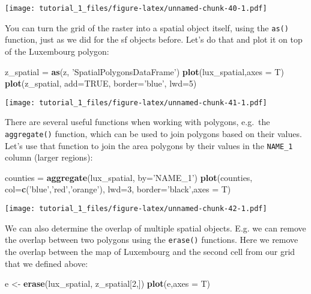 \documentclass[]{article}
\newenvironment{Shaded}{\begin{snugshade}}{\end{snugshade}}
\newcommand{\DataTypeTok}[1]{\textcolor[rgb]{0.13,0.29,0.53}{#1}}
\newcommand{\DecValTok}[1]{\textcolor[rgb]{0.00,0.00,0.81}{#1}}
\newcommand{\KeywordTok}[1]{\textcolor[rgb]{0.13,0.29,0.53}{\textbf{#1}}}
\newcommand{\NormalTok}[1]{#1}
\newcommand{\OtherTok}[1]{\textcolor[rgb]{0.56,0.35,0.01}{#1}}
\newcommand{\StringTok}[1]{\textcolor[rgb]{0.31,0.60,0.02}{#1}}
\begin{document}
\texttt{[image: tutorial\_1\_files/figure-latex/unnamed-chunk-40-1.pdf]}

You can turn the grid of the raster into a spatial object itself, using
the \texttt{as()} function, just as we did for the sf objects before.
Let's do that and plot it on top of the Luxembourg polygon:

\begin{Shaded}
\begin{Highlighting}[]
\NormalTok{z_spatial =}\StringTok{ }\KeywordTok{as}\NormalTok{(z, }\StringTok{'SpatialPolygonsDataFrame'}\NormalTok{)}
\KeywordTok{plot}\NormalTok{(lux_spatial,}\DataTypeTok{axes =}\NormalTok{ T)}
\KeywordTok{plot}\NormalTok{(z_spatial, }\DataTypeTok{add=}\OtherTok{TRUE}\NormalTok{, }\DataTypeTok{border=}\StringTok{'blue'}\NormalTok{, }\DataTypeTok{lwd=}\DecValTok{5}\NormalTok{)}
\end{Highlighting}
\end{Shaded}

\texttt{[image: tutorial\_1\_files/figure-latex/unnamed-chunk-41-1.pdf]}

There are several useful functions when working with polygons, e.g.~the
\texttt{aggregate()} function, which can be used to join polygons based
on their values. Let's use that function to join the area polygons by
their values in the \texttt{NAME\_1} column (larger regions):

\begin{Shaded}
\begin{Highlighting}[]
\NormalTok{counties =}\StringTok{ }\KeywordTok{aggregate}\NormalTok{(lux_spatial, }\DataTypeTok{by=}\StringTok{'NAME_1'}\NormalTok{)}
\KeywordTok{plot}\NormalTok{(counties, }\DataTypeTok{col=}\KeywordTok{c}\NormalTok{(}\StringTok{'blue'}\NormalTok{,}\StringTok{'red'}\NormalTok{,}\StringTok{'orange'}\NormalTok{), }\DataTypeTok{lwd=}\DecValTok{3}\NormalTok{, }\DataTypeTok{border=}\StringTok{'black'}\NormalTok{,}\DataTypeTok{axes =}\NormalTok{ T)}
\end{Highlighting}
\end{Shaded}

\texttt{[image: tutorial\_1\_files/figure-latex/unnamed-chunk-42-1.pdf]}

We can also determine the overlap of multiple spatial objects. E.g. we
can remove the overlap between two polygons using the \texttt{erase()}
functions. Here we remove the overlap between the map of Luxembourg and
the second cell from our grid that we defined above:

\begin{Shaded}
\begin{Highlighting}[]
\NormalTok{e <-}\StringTok{ }\KeywordTok{erase}\NormalTok{(lux_spatial, z_spatial[}\DecValTok{2}\NormalTok{,])}
\KeywordTok{plot}\NormalTok{(e,}\DataTypeTok{axes =}\NormalTok{ T)}
\end{Highlighting}
\end{Shaded}
\end{document}
